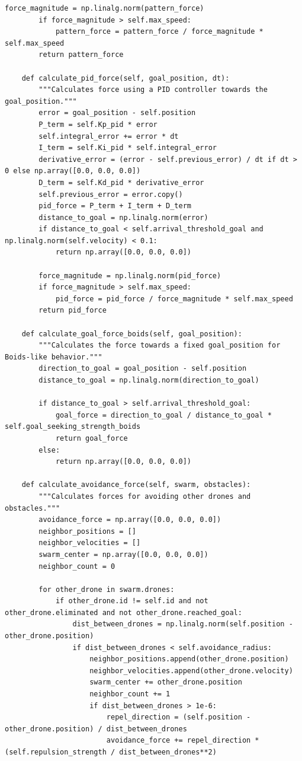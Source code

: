 \documentclass[11pt]{article}
\begin{document}
\begin{lstlisting}[style=pythonstyle]
        force_magnitude = np.linalg.norm(pattern_force)
        if force_magnitude > self.max_speed:
            pattern_force = pattern_force / force_magnitude * self.max_speed
        return pattern_force

    def calculate_pid_force(self, goal_position, dt):
        """Calculates force using a PID controller towards the goal_position."""
        error = goal_position - self.position
        P_term = self.Kp_pid * error
        self.integral_error += error * dt
        I_term = self.Ki_pid * self.integral_error
        derivative_error = (error - self.previous_error) / dt if dt > 0 else np.array([0.0, 0.0, 0.0])
        D_term = self.Kd_pid * derivative_error
        self.previous_error = error.copy()
        pid_force = P_term + I_term + D_term
        distance_to_goal = np.linalg.norm(error)
        if distance_to_goal < self.arrival_threshold_goal and np.linalg.norm(self.velocity) < 0.1:
            return np.array([0.0, 0.0, 0.0])

        force_magnitude = np.linalg.norm(pid_force)
        if force_magnitude > self.max_speed:
            pid_force = pid_force / force_magnitude * self.max_speed
        return pid_force

    def calculate_goal_force_boids(self, goal_position):
        """Calculates the force towards a fixed goal_position for Boids-like behavior."""
        direction_to_goal = goal_position - self.position
        distance_to_goal = np.linalg.norm(direction_to_goal)

        if distance_to_goal > self.arrival_threshold_goal:
            goal_force = direction_to_goal / distance_to_goal * self.goal_seeking_strength_boids
            return goal_force
        else:
            return np.array([0.0, 0.0, 0.0])

    def calculate_avoidance_force(self, swarm, obstacles):
        """Calculates forces for avoiding other drones and obstacles."""
        avoidance_force = np.array([0.0, 0.0, 0.0])
        neighbor_positions = []
        neighbor_velocities = []
        swarm_center = np.array([0.0, 0.0, 0.0])
        neighbor_count = 0

        for other_drone in swarm.drones:
            if other_drone.id != self.id and not other_drone.eliminated and not other_drone.reached_goal:
                dist_between_drones = np.linalg.norm(self.position - other_drone.position)
                if dist_between_drones < self.avoidance_radius:
                    neighbor_positions.append(other_drone.position)
                    neighbor_velocities.append(other_drone.velocity)
                    swarm_center += other_drone.position
                    neighbor_count += 1
                    if dist_between_drones > 1e-6:
                        repel_direction = (self.position - other_drone.position) / dist_between_drones
                        avoidance_force += repel_direction * (self.repulsion_strength / dist_between_drones**2)


\end{lstlisting}
\end{document}
